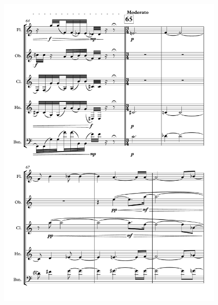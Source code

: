 \begin{figure}[H]
    \centering
	\includegraphics[width=6.5in]{figures/Out_of_Focus_14.pdf}
\end{figure}

